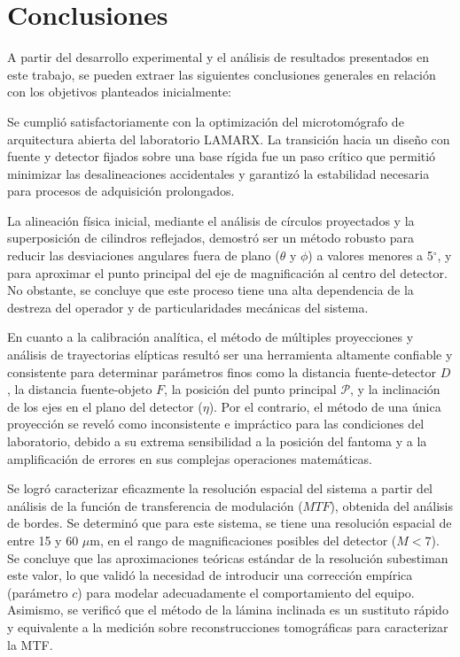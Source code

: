 \newpage

\section{Conclusiones}

A partir del desarrollo experimental y el análisis de resultados presentados en este trabajo,
se pueden extraer las siguientes conclusiones generales en relación con los objetivos planteados
inicialmente:

Se cumplió satisfactoriamente con la optimización
del microtomógrafo de arquitectura abierta del laboratorio LAMARX. La transición hacia un
diseño con fuente y detector fijados sobre una base rígida fue un paso crítico que permitió
minimizar las desalineaciones accidentales y garantizó la estabilidad necesaria para procesos
de adquisición prolongados.

La alineación física inicial, mediante el análisis de círculos proyectados y la
superposición de cilindros reflejados, demostró ser un método robusto para reducir las
desviaciones angulares fuera de plano ($\theta$ y $\phi$) a valores menores a 5$^{\circ}$, y para
aproximar el punto principal del eje de magnificación al centro del detector. No
obstante, se concluye que este proceso tiene una alta dependencia de la destreza del
operador y de particularidades mecánicas del sistema.

En cuanto a la calibración analítica, el método de múltiples proyecciones y análisis de trayectorias
elípticas resultó
ser una herramienta altamente confiable y consistente para determinar parámetros finos como
la distancia fuente-detector $D$, la distancia fuente-objeto $F$, la posición del punto principal $\mathcal{P}$,
y la inclinación de los ejes en el plano del detector ($\eta$).
Por el contrario, el método de una única proyección se reveló
como inconsistente e impráctico para las condiciones del laboratorio, debido a su extrema
sensibilidad a la posición del fantoma y a la amplificación de errores en sus
complejas operaciones matemáticas.

Se logró caracterizar eficazmente la resolución espacial del sistema a partir del análisis de
la función de transferencia de modulación ($MTF$), obtenida del análisis de bordes. Se determinó
que para este sistema, se tiene una resolución espacial de entre 15 y 60
$\mu$m, en el rango de magnificaciones posibles del detector ($M<7$). Se concluye que las aproximaciones
teóricas estándar de la resolución subestiman este valor, lo que validó la necesidad de introducir una
corrección empírica (parámetro $c$) para modelar adecuadamente el comportamiento del equipo.
Asimismo, se verificó que el método de la lámina inclinada es un sustituto rápido y equivalente
a la medición sobre reconstrucciones tomográficas para caracterizar la MTF.

